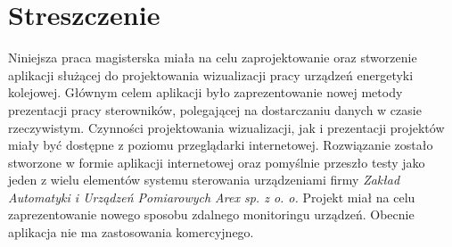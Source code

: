 \chapter*{Streszczenie}

Niniejsza praca magisterska miała na celu zaprojektowanie oraz stworzenie aplikacji służącej do projektowania wizualizacji pracy urządzeń energetyki kolejowej. Głównym celem aplikacji było zaprezentowanie nowej metody prezentacji pracy sterowników, polegającej na dostarczaniu danych w czasie rzeczywistym. Czynności projektowania wizualizacji, jak i prezentacji projektów miały być dostępne z poziomu przeglądarki internetowej.
Rozwiązanie zostało stworzone w formie aplikacji internetowej oraz pomyślnie przeszło testy jako jeden z wielu elementów systemu sterowania urządzeniami firmy \textit{Zakład Automatyki i Urządzeń Pomiarowych Arex sp. z o. o.} Projekt miał na celu zaprezentowanie nowego sposobu zdalnego monitoringu urządzeń. Obecnie aplikacja nie ma zastosowania komercyjnego.
